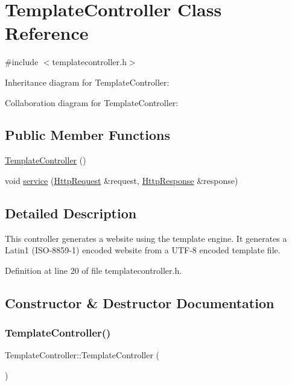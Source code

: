 \hypertarget{class_template_controller}{}\section{Template\+Controller Class Reference}
\label{class_template_controller}


{\ttfamily \#include $<$templatecontroller.\+h$>$}



Inheritance diagram for Template\+Controller\+:


Collaboration diagram for Template\+Controller\+:
\subsection*{Public Member Functions}
\begin{DoxyCompactItemize}
\item 
\mbox{\hyperlink{class_template_controller_ad3fed77e4c4fffdcb0c04e9d8e6d0518}{Template\+Controller}} ()
\item 
void \mbox{\hyperlink{class_template_controller_ad34c48cf60094e0deb73aa7145e93eac}{service}} (\mbox{\hyperlink{classstefanfrings_1_1_http_request}{Http\+Request}} \&request, \mbox{\hyperlink{classstefanfrings_1_1_http_response}{Http\+Response}} \&response)
\end{DoxyCompactItemize}


\subsection{Detailed Description}
This controller generates a website using the template engine. It generates a Latin1 (I\+S\+O-\/8859-\/1) encoded website from a U\+T\+F-\/8 encoded template file. 

Definition at line 20 of file templatecontroller.\+h.



\subsection{Constructor \& Destructor Documentation}
\mbox{\label{class_template_controller_ad3fed77e4c4fffdcb0c04e9d8e6d0518}} 
\subsubsection{\texorpdfstring{Template\+Controller()}{TemplateController()}}
{\footnotesize\ttfamily Template\+Controller\+::\+Template\+Controller (\begin{DoxyParamCaption}{ }\end{DoxyParamCaption})}

